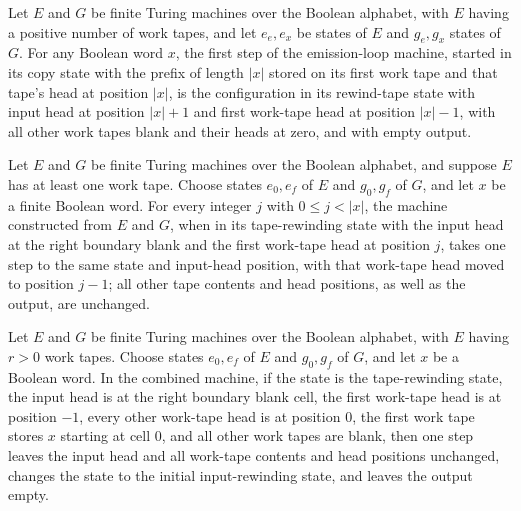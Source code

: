 \begin{theorem}
\label{Turing.copy_end}
\leanok
{}
Let $E$ and $G$ be finite Turing machines over the Boolean alphabet, with $E$ having a
positive number of work tapes, and let $e_e,e_x$ be states of $E$ and $g_e,g_x$ states
of $G$. For any Boolean word $x$, the first step of the emission-loop machine, started
in its copy state with the prefix of length $|x|$ stored on its first work tape and that
tape's head at position $|x|$, is the configuration in its rewind-tape state with input
head at position $|x|+1$ and first work-tape head at position $|x|-1$, with all other
work tapes blank and their heads at zero, and with empty output.
\end{theorem}

\begin{theorem}
\label{Turing.rwTape_some}
\leanok
{}
Let $E$ and $G$ be finite Turing machines over the Boolean alphabet, and suppose $E$ has
at least one work tape. Choose states $e_0,e_f$ of $E$ and $g_0,g_f$ of $G$, and let $x$
be a finite Boolean word. For every integer $j$ with $0\le j<|x|$, the machine
constructed from $E$ and $G$, when in its tape-rewinding state with the input head at
the right boundary blank and the first work-tape head at position $j$, takes one step to
the same state and input-head position, with that work-tape head moved to position
$j-1$; all other tape contents and head positions, as well as the output, are unchanged.
\end{theorem}

\begin{theorem}
\label{Turing.rwTape_none}
\leanok
{}
Let $E$ and $G$ be finite Turing machines over the Boolean alphabet, with $E$ having
$r>0$ work tapes. Choose states $e_0,e_f$ of $E$ and $g_0,g_f$ of $G$, and let $x$ be a
Boolean word. In the combined machine, if the state is the tape-rewinding state, the
input head is at the right boundary blank cell, the first work-tape head is at position
$-1$, every other work-tape head is at position $0$, the first work tape stores $x$
starting at cell $0$, and all other work tapes are blank, then one step leaves the input
head and all work-tape contents and head positions unchanged, changes the state to the
initial input-rewinding state, and leaves the output empty.
\end{theorem}

